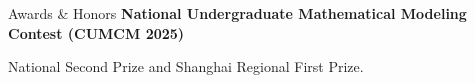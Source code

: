 \begin{rubric}{Awards \& Honors}
\entry*[2025]%
	\textbf{National Undergraduate Mathematical Modeling Contest (CUMCM 2025)}\par
	National Second Prize and Shanghai Regional First Prize.
\end{rubric}